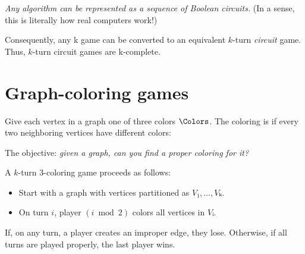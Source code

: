 \documentclass[thesis, landscape]{hmcposter}
\begin{document}
\begin{poster}
\emph{Any algorithm can be represented as a sequence of Boolean circuits.}  (In
a sense, this is literally how real computers work!)

Consequently, any \SigmaP k game can be converted to an equivalent \(k\)-turn
\emph{circuit} game.  Thus, \(k\)-turn circuit games are \SigmaP k-complete.

\section{Graph-coloring games}

Give each vertex in a graph one of three colors \(\Colors\).  The coloring is
 if every two neighboring vertices have different colors:

\begin{center}
\end{center}

The objective: \emph{given a graph, can you find a proper coloring for it?}

A \(k\)-turn 3-coloring game proceeds as follows:
\begin{itemize}[nosep]
  \item Start with a graph with vertices partitioned as \(V₁,\dotsc,Vₖ\).
  \item On turn \(i\), player \((i\bmod 2)\) colors all vertices in \(Vᵢ\).
\end{itemize}
If, on any turn, a player creates an improper edge, they lose. Otherwise, if all
turns are played properly, the last player wins.


\end{poster}
\end{document}
